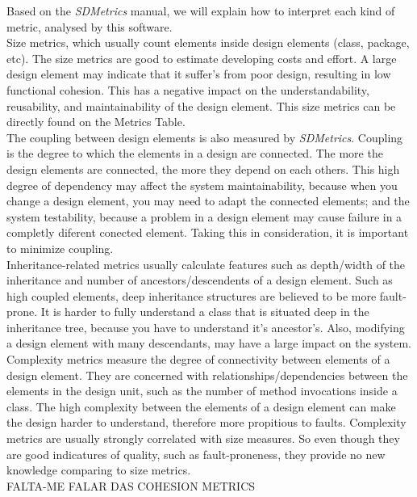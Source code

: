 Based on the \textit{SDMetrics} manual, we will explain how to interpret each kind of metric, analysed by this software. \\
Size metrics, which usually count elements inside design elements (class, package, etc). The size metrics are good to estimate developing costs and effort. A large design element may indicate that it suffer's from poor design, resulting in low functional cohesion. This 	has a negative impact on the understandability, reusability, and maintainability of the design element. This size metrics can be directly found on the Metrics Table.\\
The coupling between design elements is also measured by \textit{SDMetrics}. Coupling is the degree to which the elements in a design are connected. The more the design elements are connected, the more they depend on each others. This high degree of dependency may affect the system maintainability, because when you change a design element, you may need to adapt the connected elements; and the system testability, because a problem in a design element may cause failure in a completly diferent conected element. Taking this in consideration, it is important to minimize coupling.\\
Inheritance-related metrics usually calculate features such as depth/width of the inheritance and number of ancestors/descendents of a design element. Such as high coupled elements, deep inheritance structures are believed to be more fault-prone. It is harder to fully understand a class that is situated deep in the inheritance tree, because you have to understand it's ancestor's. Also, modifying a design element with many descendants, may have a large impact on the system.\\
Complexity metrics measure the degree of connectivity between elements of a design element. They are concerned with relationships/dependencies between the elements in the design unit, such as the number of method invocations inside a class. The high complexity between the elements of a design element can make the design harder to understand, therefore more propitious to faults. Complexity metrics are usually strongly correlated with size measures. So even though they are good indicatures of quality, such as fault-proneness, they provide no new knowledge comparing to size metrics.\\
FALTA-ME FALAR DAS COHESION METRICS


 
